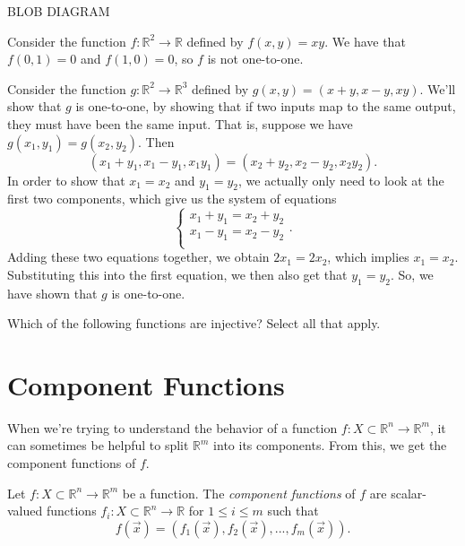\documentclass{ximera}
\begin{document}
BLOB DIAGRAM

\begin{example}
Consider the function $f:\mathbb{R}^2\rightarrow\mathbb{R}$ defined by $f(x,y) = xy$. We have that $f(0,1) = 0$ and $f(1,0)=0$, so $f$ is not one-to-one.

Consider the function $g:\mathbb{R}^2\rightarrow\mathbb{R}^3$ defined by $g(x,y) = (x+y, x-y, xy)$. We'll show that $g$ is one-to-one, by showing that if two inputs map to the same output, they must have been the same input. That is, suppose we have $g(x_1,y_1) = g(x_2,y_2)$. Then
\[
(x_1+y_1, x_1-y_1, x_1y_1) = (x_2+y_2, x_2-y_2, x_2y_2).
\]
In order to show that $x_1=x_2$ and $y_1=y_2$, we actually only need to look at the first two components, which give us the system of equations
\[
\begin{cases}
x_1+y_1 = x_2+y_2\\
x_1-y_1 = x_2-y_2\\
\end{cases}.
\]
Adding these two equations together, we obtain $2x_1 = 2x_2$, which implies $x_1 = x_2$. Substituting this into the first equation, we then also get that $y_1=y_2$. So, we have shown that $g$ is one-to-one.
\end{example}

\begin{problem}
Which of the following functions are injective? Select all that apply.
\begin{selectAll}
\end{selectAll}
\end{problem}

\section*{Component Functions}

When we're trying to understand the behavior of a function $f:X\subset \mathbb{R}^n\rightarrow \mathbb{R}^m$, it can sometimes be helpful to split $\mathbb{R}^m$ into its components. From this, we get the component functions of $f$.

\begin{definition}
Let $f:X\subset \mathbb{R}^n\rightarrow \mathbb{R}^m$ be a function. The \emph{component functions} of $f$ are scalar-valued functions $f_i:X\subset\mathbb{R}^n\rightarrow\mathbb{R}$ for $1\leq i\leq m$ such that 
\[
f(\vec{x}) = (f_1(\vec{x}),f_2(\vec{x}),...,f_m(\vec{x})).
\]
\end{definition}
\end{document}
